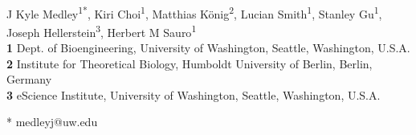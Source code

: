 \documentclass[10pt,letterpaper]{article}
\date{}
\begin{document}
\vspace*{0.2in}

\begin{flushleft}
{\Large
\textbf{} %
}
\newline
\\
J Kyle Medley\textsuperscript{1*},
Kiri Choi\textsuperscript{1},
Matthias K\"{o}nig\textsuperscript{2},
Lucian Smith\textsuperscript{1},
Stanley Gu\textsuperscript{1},
Joseph Hellerstein\textsuperscript{3},
Herbert M Sauro\textsuperscript{1}
\\
\bigskip
\textbf{1} Dept. of Bioengineering, University of Washington, Seattle, Washington, U.S.A.
\\
\textbf{2} Institute for Theoretical Biology, Humboldt University of Berlin, Berlin, Germany
\\
\textbf{3} eScience Institute, University of Washington, Seattle, Washington, U.S.A.
\\
\bigskip

%



%
%




* medleyj@uw.edu

\end{flushleft}
\end{document}
